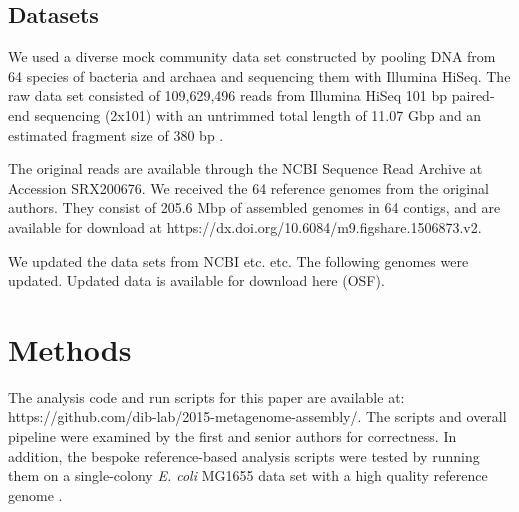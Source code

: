 \documentclass[11pt]{article}
\begin{document}


 

\subsection*{Datasets}

We used a diverse mock community data set constructed by pooling DNA
from 64 species of bacteria and archaea and sequencing them with
Illumina HiSeq.  The raw data set consisted of 109,629,496 reads from
Illumina HiSeq 101 bp paired-end sequencing (2x101) with an untrimmed
total length of 11.07 Gbp and an estimated fragment size of 380 bp
\cite{podar}.
 
The original reads are available through the NCBI Sequence Read
Archive at Accession SRX200676.
We received the 64 reference genomes from the original authors. They
consist of 205.6 Mbp of assembled genomes in 64 contigs, and are
available for download at
https://dx.doi.org/10.6084/m9.figshare.1506873.v2.

We updated the data sets from NCBI etc. etc.  The following genomes
were updated.  Updated data is available for download here (OSF).

\section*{Methods}
The analysis code and run scripts for this paper are available at:
https://github.com/dib-lab/2015-metagenome-assembly/. The scripts and
overall pipeline were examined by the first and senior authors for
correctness.  In addition, the bespoke reference-based analysis
scripts were tested by running them on a single-colony {\em E. coli} MG1655
data set with a high quality reference genome \cite{chitsaz2011}.
\end{document}
